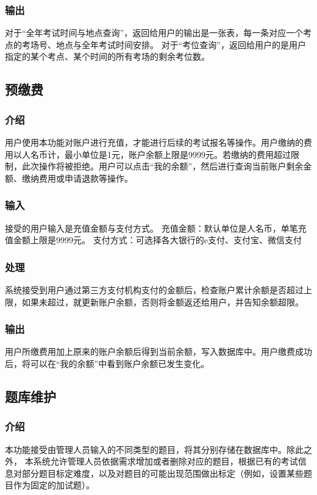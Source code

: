 \subsubsection{输出}
对于“全年考试时间与地点查询”，返回给用户的输出是一张表，每一条对应一个考点的考场号、地点与全年考试时间安排。
对于“考位查询”，返回给用户的是用户指定的某个考点、某个时间的所有考场的剩余考位数。

\subsection{预缴费}

\subsubsection{介绍}
用户使用本功能对账户进行充值，才能进行后续的考试报名等操作。用户缴纳的费用以人名币计，最小单位是1元，账户余额上限是9999元。若缴纳的费用超过限制，此次操作将被拒绝。用户可以点击“我的余额”，然后进行查询当前账户剩余金额、缴纳费用或申请退款等操作。

\subsubsection{输入}
接受的用户输入是充值金额与支付方式。
充值金额：默认单位是人名币，单笔充值金额上限是9999元。
支付方式：可选择各大银行的e支付、支付宝、微信支付

\subsubsection{处理}
系统接受到用户通过第三方支付机构支付的金额后，检查账户累计余额是否超过上限，如果未超过，就更新账户余额，否则将金额返还给用户，并告知余额超限。

\subsubsection{输出}
用户所缴费用加上原来的账户余额后得到当前余额，写入数据库中。用户缴费成功后，将可以在“我的余额”中看到账户余额已发生变化。

\subsection{题库维护}

\subsubsection{介绍}
本功能接受由管理人员输入的不同类型的题目，将其分别存储在数据库中。除此之外， 本系统允许管理人员依据需求增加或者删除对应的题目，根据已有的考试信息对部分题目标定难度，以及对题目的可能出现范围做出标定（例如，设置某些题目作为固定的加试题）。

